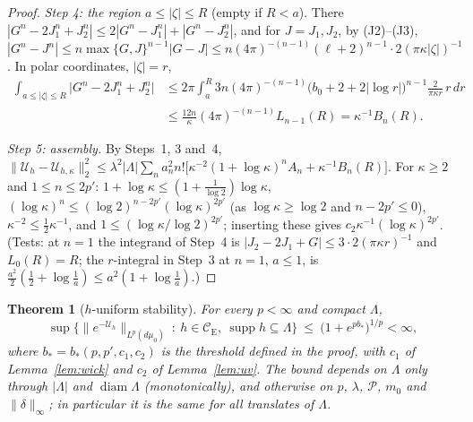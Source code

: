 \documentclass[11pt,a4paper]{article}
\theoremstyle{plain}
\newtheorem{theorem}{Theorem}[section]
\theoremstyle{definition}
\theoremstyle{plain}
\theoremstyle{definition}
\newcommand{\CE}{\mathcal{C}_{\mathrm E}}
\DeclareMathOperator{\supp}{supp}
\begin{document}
\begin{proof}
\emph{Step 4: the region $a\le|\zeta|\le R$} (empty if $R<a$).  There
$|G^n-2J_1^n+J_2^n|\le2|G^n-J_1^n|+|G^n-J_2^n|$, and for $J=J_1,J_2$, by (J2)--(J3),
$|G^n-J^n|\le n\max\{G,J\}^{n-1}|G-J|\le n(4\pi)^{-(n-1)}(\ell+2)^{n-1}\cdot2(\pi\kappa|\zeta|)^{-1}$.
In polar coordinates, $|\zeta|=r$,
\begin{align*}
  \int_{a\le|\zeta|\le R}\bigl|G^n-2J_1^n+J_2^n\bigr|
  &\le2\pi\int_a^R3n(4\pi)^{-(n-1)}\bigl(b_0+2+2|\log r|\bigr)^{n-1}\frac{2}{\pi\kappa r}\,r\,dr\\
  &\le\frac{12n}{\kappa}(4\pi)^{-(n-1)}L_{n-1}(R)=\kappa^{-1}B_n(R) .
\end{align*}

\emph{Step 5: assembly.}  By Steps~1, 3 and~4,
$\|\mathcal U_h-\mathcal U_{h,\kappa}\|_2^2\le\lambda^2|\Lambda|\sum_na_n^2n!\bigl[\kappa^{-2}
(1+\log\kappa)^nA_n+\kappa^{-1}B_n(R)\bigr]$.  For $\kappa\ge2$ and $1\le n\le2p'$:
$1+\log\kappa\le(1+\frac1{\log2})\log\kappa$, $(\log\kappa)^n\le(\log2)^{n-2p'}(\log\kappa)^{2p'}$
(as $\log\kappa\ge\log2$ and $n-2p'\le0$), $\kappa^{-2}\le\frac12\kappa^{-1}$, and
$1\le(\log\kappa/\log2)^{2p'}$; inserting these gives $c_2\kappa^{-1}(\log\kappa)^{2p'}$.
(Tests: at $n=1$ the integrand of Step~4 is $|J_2-2J_1+G|\le3\cdot2(\pi\kappa r)^{-1}$ and
$L_0(R)=R$; the $r$-integral in Step~3 at $n=1$, $a\le1$, is $\frac{a^2}2(\frac12+\log\frac1a)
\le a^2(1+\log\frac1a)$.)
\end{proof}

\begin{theorem}[$h$-uniform stability]\label{thm:stability}
For every $p<\infty$ and compact $\Lambda$,
\[
  \sup\bigl\{\|e^{-\mathcal U_h}\|_{L^p(d\mu_0)}\ :\ h\in\CE,\
  \supp h\subseteq\Lambda\bigr\}\ \le\ \bigl(1+e^{pb_*}\bigr)^{1/p}<\infty ,
\]
where $b_*=b_*(p,p',c_1,c_2)$ is the threshold defined in the proof, with $c_1$ of
Lemma~\ref{lem:wick} and $c_2$ of Lemma~\ref{lem:uv}.  The bound depends on $\Lambda$ only
through $|\Lambda|$ and $\operatorname{diam}\Lambda$ (monotonically), and otherwise on
$p$, $\lambda$, $\mathscr P$, $m_0$ and $\|\delta\|_\infty$; in particular it is the same
for all translates of $\Lambda$.
\end{theorem}
\end{document}
